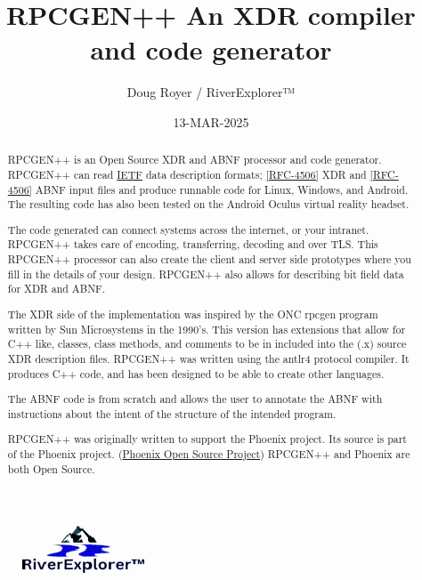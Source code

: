 \documentclass[2pt]{article}
\author{Doug Royer / RiverExplorer™}
\date{13-MAR-2025}
\title{RPCGEN++ An XDR compiler and code generator}
\begin{document}
\maketitle
  \begin{figure}
    \centering
    \includegraphics{RiverExplorerLLC-Logo-BLACK-131x50-Transparent.ps.png}
  \end{figure}
  
\begin{abstract}
  RPCGEN++ is an Open Source XDR and ABNF processor and code generator.
  RPCGEN++ can read \href{https://ietf.org}{IETF} data description
  formats;
  \href{https://datatracker.ietf.org/doc/html/rfc4506}{[RFC-4506]}
  XDR and \href{https://datatracker.ietf.org/doc/html/rfc5234}{[RFC-4506]}
  ABNF input files and produce runnable code for Linux, Windows,
  and Android. The resulting code has also been tested on the Android
  Oculus virtual reality headset.

  The code generated can connect systems across the internet,
  or your intranet.
  RPCGEN++ takes care of encoding, transferring, decoding and over
  TLS. This RPCGEN++ processor can also create the client and server side
  prototypes where you fill in the details of your design.
  RPCGEN++ also allows for describing bit field data for XDR and ABNF.
  
  The XDR side of the implementation was inspired by the ONC
  rpcgen program written by Sun Microsystems
  in the 1990's.
  This version has extensions that allow for C++ like, classes, class
  methods, and comments to be in included into the (.x) source XDR
  description files. RPCGEN++ was written using the antlr4 protocol
  compiler. It produces C++ code, and has been designed to be able
  to create other languages.

  The ABNF code is from scratch and allows the user to annotate
  the ABNF with instructions about the intent of the structure
  of the intended program.
  
  RPCGEN++ was originally written to support the Phoenix project.
  Its source is part of the Phoenix project.
  (\href{https://github.com/RiverExplorer/Phoenix}{Phoenix Open Source Project})
  RPCGEN++ and Phoenix are both Open Source.
\end{abstract}
\tableofcontents
















\end{document}
